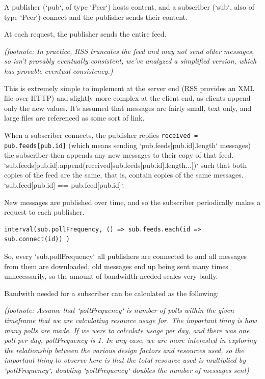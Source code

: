 \documentclass[sigconf]{acmart}
\begin{document}
A publisher (`pub`, of type `Peer`) hosts content, and a subscriber
(`sub`, also of type `Peer`) connect and the publisher sends their
content.

At each request, the publisher sends the entire feed.

{\em (footnote: In practice, RSS truncates the feed and may not send
  older messages, so isn't provably eventually consistent, we've
  analyzed a simplified version, which has provable eventual
  consistency.)}

This is extremely simple to implement at the server end (RSS provides
an XML file over HTTP) and slightly more complex at the client end, as
clients append only the new values.  It's assumed that messages are
fairly small, text only, and large files are referenced as some sort
of link.

When a subscriber connects, the publisher replies {\tt received =
pub.feeds[pub.id]} (which means sending `pub.feeds[pub.id].length`
messages) the subscriber then appends any new messages to their copy
of that feed.
`sub.feeds[pub.id].append(received[sub.feeds[pub.id].length...])` such
that both copies of the feed are the same, that is, contain copies of
the same messages. `sub.feed[pub.id] == pub.feed[pub.id]`.

New messages are published over time, and so the subscriber
periodically makes a request to each publisher.

\begin{verbatim}
interval(sub.pollFrequency, () => sub.feeds.each(id => sub.connect(id)) )
\end{verbatim}

So, every `sub.pollFrequency` all publishers are connected to and all
messages from them are downloaded, old messages end up being sent many
times unnecessarily, so the amount of bandwidth needed scales very
badly.

Bandwith needed for a subscriber can be calculated as the following:

{\em (footnote: Assume that `pollFrequency` is number of polls within
  the given timeframe that we are calculating resource usage for. The
  important thing is how many polls are made.  If we were to calculate
  usage per day, and there was one poll per day, pollFrequency is
  1. In any case, we are more interested in exploring the relationship
  between the various design factors and resources used, so the
  important thing to observe here is that the total resource used is
  {\em multiplied} by `pollFrequency`, doubling `pollFrequency`
  doubles the number of messages sent)}
\end{document}
